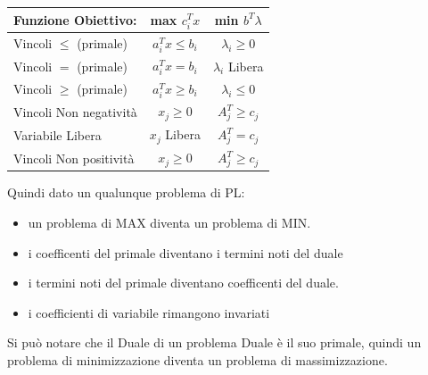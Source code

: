 \documentclass[12pt, a4paper, openany]{book}
\begin{document}
\begin{center}
    \begin{tabular}{ |l|c|c| }
        \hline
        Funzione Obiettivo:      & max $c_i^Tx$      & min $b^T\lambda$   \\
        \hline \hline
        Vincoli $\leq$ (primale) & $a_i^Tx \leq b_i$ & $\lambda_i \geq 0$ \\
        Vincoli $=$ (primale)    & $a_i^Tx = b_i$    & $\lambda_i$ Libera \\
        Vincoli $\geq$ (primale) & $a_i^Tx \geq b_i$ & $\lambda_i \leq 0$ \\
        \hline
        Vincoli Non negatività   & $x_j\geq 0$       & $A_j^T \geq c_j$   \\
        Variabile Libera         & $x_j$ Libera      & $A_j^T = c_j$      \\
        Vincoli Non positività   & $x_j\geq 0$       & $A_j^T \geq c_j$   \\
        \hline
    \end{tabular}
\end{center}
Quindi dato un qualunque problema di PL:
\begin{itemize}
    \item un problema di MAX diventa un problema di MIN.
    \item i coefficenti del primale diventano i termini noti del duale
    \item i termini noti del primale diventano coefficenti del duale.
    \item i coefficienti di variabile rimangono invariati
\end{itemize}
Si può notare che il Duale di un problema Duale è il suo primale, quindi un problema di minimizzazione diventa un problema di massimizzazione.
\end{document}
